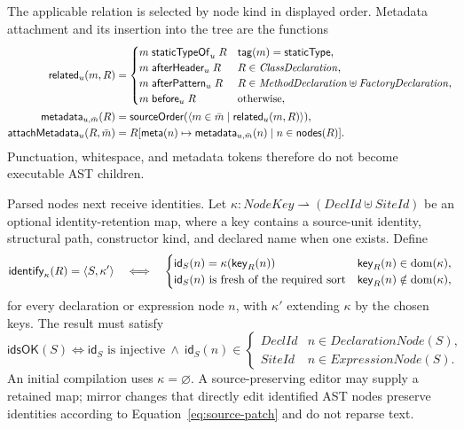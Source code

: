 The applicable relation is selected by node kind in displayed order.  Metadata
attachment and its insertion into the tree are the functions
\begin{equation}\label{eq:metadata-attachment}
\begin{aligned}
 \mathsf{related}_{u}(m,R)&=
  \begin{cases}
   m\mathrel{\mathsf{staticTypeOf}_{u}}R&\mathsf{tag}(m)=\mathsf{staticType},\\
   m\mathrel{\mathsf{afterHeader}_{u}}R
      &R\in\mathit{ClassDeclaration},\\
   m\mathrel{\mathsf{afterPattern}_{u}}R
      &R\in\mathit{MethodDeclaration}\uplus\mathit{FactoryDeclaration},\\
   m\mathrel{\mathsf{before}_{u}}R&\text{otherwise,}
  \end{cases}\\
 \mathsf{metadata}_{u,\bar m}(R)&=
   \mathsf{sourceOrder}(\langle m\in\bar m\mid
      \mathsf{related}_{u}(m,R)\rangle),\\
 \mathsf{attachMetadata}_{u}(R,\bar m)&=
   R[\mathsf{meta}(n)\mapsto\mathsf{metadata}_{u,\bar m}(n)
       \mid n\in\mathsf{nodes}(R)].
\end{aligned}
\end{equation}
Punctuation, whitespace, and metadata tokens therefore do not become
executable AST children.

Parsed nodes next receive identities.  Let
$\kappa:\mathit{NodeKey}\rightharpoonup
 (\mathit{DeclId}\uplus\mathit{SiteId})$ be an optional identity-retention map,
where a key contains a source-unit identity, structural path, constructor kind,
and declared name when one exists.  Define
\begin{equation}\label{eq:stable-ast-identification}
 \mathsf{identify}_{\kappa}(R)=\langle S,\kappa'\rangle
 \quad\Longleftrightarrow\quad
 \begin{cases}
  \mathsf{id}_{S}(n)=\kappa(\mathsf{key}_{R}(n))
    &\mathsf{key}_{R}(n)\in\mathop{\mathrm{dom}}(\kappa),\\
  \mathsf{id}_{S}(n)\text{ is fresh of the required sort}
    &\mathsf{key}_{R}(n)\notin\mathop{\mathrm{dom}}(\kappa),
 \end{cases}
\end{equation}
for every declaration or expression node $n$, with $\kappa'$ extending
$\kappa$ by the chosen keys.  The result must satisfy
\begin{equation}\label{eq:stable-ast-identity-validity}
 \mathsf{idsOK}(S)\Longleftrightarrow
 \mathsf{id}_{S}\text{ is injective}\ \land\
 \mathsf{id}_{S}(n)\in
 \begin{cases}\mathit{DeclId}&n\in\mathit{DeclarationNode}(S),\\
               \mathit{SiteId}&n\in\mathit{ExpressionNode}(S).
 \end{cases}
\end{equation}
An initial compilation uses $\kappa=\varnothing$.  A source-preserving editor
may supply a retained map; mirror changes that directly edit identified AST
nodes preserve identities according to Equation~\eqref{eq:source-patch} and do
not reparse text.

